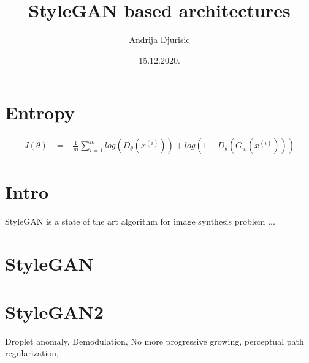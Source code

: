 \documentclass{article}
\title{StyleGAN based architectures}
\author{Andrija Djurisic}
\date{15.12.2020.}
\begin{document}
   \maketitle

\section{Entropy}

\begin{align*}
J(\theta) &= -\frac{1}{m} \sum_{i = 1}^{m} {log(D_{\theta}(x^{(i)})) + log(1 - D_{\theta}(G_{w}(x^{(i)})))}
\end{align*}
\section{Intro}

StyleGAN is a state of the art algorithm for image synthesis problem ...

\section{StyleGAN}
\section{StyleGAN2}

Droplet anomaly, Demodulation, No more progressive growing, perceptual path regularization, 
\end{document}
